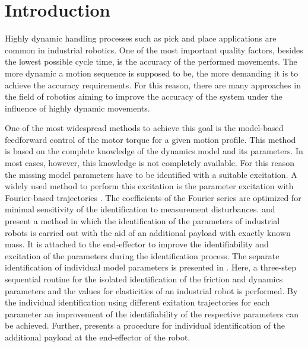 
\section{Introduction}
\label{subsec:Introduction}

Highly dynamic handling processes such as pick and place applications are common in industrial robotics.
One of the most important quality factors, besides the lowest possible cycle time, is the accuracy of the performed movements. The more dynamic a motion sequence is supposed to be, the more demanding it is to achieve the accuracy requirements. For this reason, there are many approaches in the field of robotics aiming to improve the accuracy of the system under the influence of highly dynamic movements. 

One of the most widespread methods to achieve this goal is the model-based feedforward control of the motor torque for a given motion profile.
This method is based on the complete knowledge of the dynamics model and its parameters. 
In most cases, however, this knowledge is not completely available. 
For this reason the missing model parameters have to be identified with a suitable excitation. 
A widely used method to perform this excitation is the parameter excitation with Fourier-based trajectories \cite{Park.2006,Swevers.1997}.
The coefficients of the Fourier series are optimized for minimal sensitivity of the identification to measurement disturbances. 
\cite{Goutier.2012} and \cite{Goutier.2014} present a method in which the identification of the parameters of industrial robots is carried out with the aid of an additional payload with exactly known mass. 
It is attached to the end-effector to improve the identifiability and excitation of the parameters during the identification process.
The separate identification of individual model parameters is presented in \cite{Wernholt.2006}. 
Here, a three-step sequential routine for the isolated identification of the friction and dynamics parameters and the values for elasticities of an industrial robot is performed. By the individual identification using different exitation trajectories for each parameter an improvement of the identifiability of the respective parameters can be achieved.
Further, \cite{Khalil.2007} presents a procedure for individual identification of the additional payload at the end-effector of the robot.

